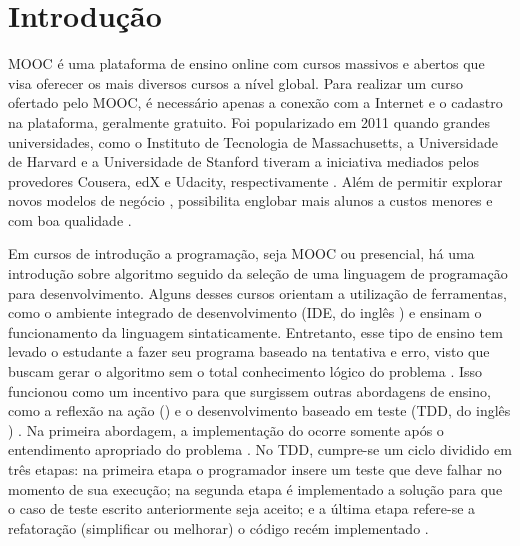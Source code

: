 \chapter{Introdução}

	\ac{MOOC} é uma plataforma de ensino online
	com cursos massivos e abertos que visa oferecer os mais diversos cursos a nível
	global. Para realizar um curso ofertado pelo MOOC, é necessário apenas a conexão
	com a Internet e o cadastro na plataforma, geralmente gratuito. Foi popularizado
	em 2011 quando grandes universidades, como o Instituto de Tecnologia de
	Massachusetts, a Universidade de Harvard e a Universidade de Stanford tiveram
	a iniciativa mediados pelos provedores Cousera, edX e Udacity, respectivamente
	\cite{Mehlenbacher:2012}. Além de permitir explorar novos modelos de negócio
	\cite{dellarocas2013money}, possibilita englobar mais alunos a custos menores
	e com boa qualidade \cite{schmidt2013producing}.
	
	Em cursos de introdução a programação, seja MOOC ou presencial, há uma introdução
	sobre algoritmo seguido da seleção de uma linguagem de programação para
	desenvolvimento. Alguns desses cursos orientam a utilização de ferramentas, como
	o ambiente integrado de desenvolvimento (IDE, do inglês ) e ensinam o funcionamento da linguagem sintaticamente.
	Entretanto, esse tipo de ensino tem levado o estudante a fazer seu programa baseado
	na tentativa e erro, visto que buscam gerar o algoritmo sem o total conhecimento
	lógico do problema \cite{edwards2003}. Isso funcionou como um incentivo para que
	surgissem outras abordagens de ensino, como a reflexão na ação () e o desenvolvimento baseado em teste (TDD, do inglês ) \cite{camara_graciottoSilva2016}. Na primeira abordagem, a
	implementação do  ocorre somente após o entendimento apropriado
	do problema \cite{edwards2004}. No TDD, cumpre-se um ciclo dividido em três etapas:
	na primeira etapa o programador insere um teste que deve falhar no momento de sua
	execução; na segunda etapa é implementado a solução para que o caso de teste
	escrito anteriormente seja aceito; e a última etapa refere-se a refatoração
	(simplificar ou melhorar) o código recém implementado \cite{beck2003}.
	
